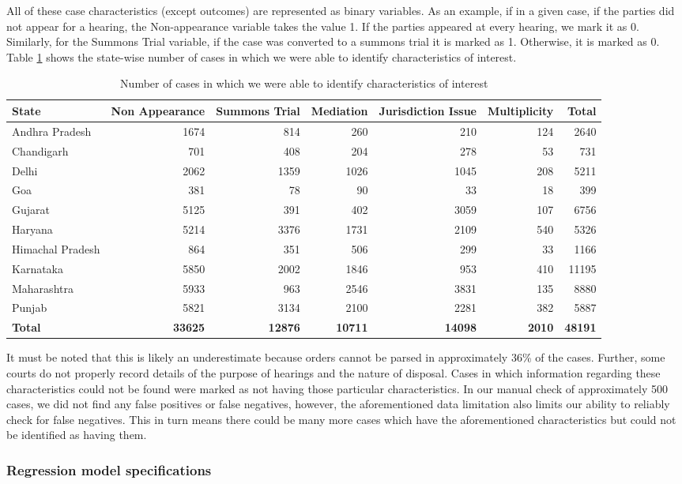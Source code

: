 All of these case characteristics (except outcomes) are represented as
binary variables. As an example, if in a given case, if the parties
did not appear for a hearing, the Non-appearance variable takes the
value 1. If the parties appeared at every hearing, we mark it as
0. Similarly, for the Summons Trial variable, if the case was
converted to a summons trial it is marked as 1. Otherwise, it is
marked as 0. Table \ref{tab:case_chars} shows the state-wise number of
cases in which we were able to identify characteristics of interest.

\begin{longtable}{@{}lrrrrrr@{}}
  \caption{Number of cases in which we were able to identify
    characteristics of interest}
  \label{tab:case_chars}\\
  \toprule
  \textbf{State} & \textbf{Non Appearance} & \textbf{Summons Trial} & \textbf{Mediation} & \textbf{Jurisdiction Issue} & \textbf{Multiplicity} & \textbf{Total} \\
  \endhead
  Andhra Pradesh & 1674 & 814 & 260 & 210 & 124 & 2640 \\
  Chandigarh & 701 & 408 & 204 & 278 & 53 & 731 \\
  Delhi & 2062 & 1359 & 1026 & 1045 & 208 & 5211 \\
  Goa & 381 & 78 & 90 & 33 & 18 & 399 \\
  Gujarat & 5125 & 391 & 402 & 3059 & 107 & 6756 \\
  Haryana & 5214 & 3376 & 1731 & 2109 & 540 & 5326 \\
  Himachal Pradesh & 864 & 351 & 506 & 299 & 33 & 1166 \\
  Karnataka & 5850 & 2002 & 1846 & 953 & 410 & 11195 \\
  Maharashtra & 5933 & 963 & 2546 & 3831 & 135 & 8880 \\
  Punjab & 5821 & 3134 & 2100 & 2281 & 382 & 5887 \\
  \textbf{Total} & \textbf{33625} & \textbf{12876} & \textbf{10711} &
  \textbf{14098} & \textbf{2010} & \textbf{48191}\\\bottomrule
\end{longtable}

It must be noted that this is likely an underestimate because orders cannot be parsed in approximately 36\% of the cases. Further, some courts do not properly record details of the purpose of hearings and the nature of disposal. Cases in which information regarding these characteristics could not be found were marked as not having those particular characteristics. In our manual check of approximately 500 cases, we did not find any false positives or false negatives, however, the aforementioned data limitation also limits our ability to reliably check for false negatives. This in turn means there could be many more cases which have the aforementioned characteristics but could not be identified as having them.

\subsubsection{Regression model specifications}
\label{sec:model-selection}


